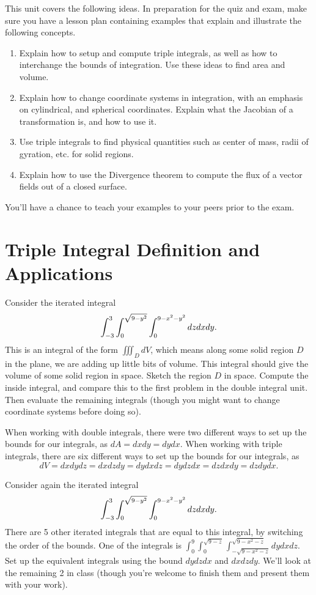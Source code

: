 
\noindent 
This unit covers the following ideas. In preparation for the quiz and exam, make sure you have a lesson plan containing examples that explain and illustrate the following concepts.  
\begin{enumerate}
\item Explain how to setup and compute triple integrals, as well as how to interchange the bounds of integration. Use these ideas to find area and volume.
\item Explain how to change coordinate systems in integration, with an emphasis on cylindrical, and spherical coordinates. Explain what the Jacobian of a transformation is, and how to use it.
\item Use triple integrals to find physical quantities such as center of mass, radii of gyration, etc. for solid regions.
\item Explain how to use the Divergence theorem to compute the flux of a vector fields out of a closed surface.
\end{enumerate}
You'll have a chance to teach your examples to your peers prior to the exam.


\section{Triple Integral Definition and Applications}

\begin{problem}
Consider the iterated integral $$\displaystyle \int_{-3}^3 \int_0^{\sqrt{9-y^2}}\int_0^{9-x^2-y^2} dzdxdy.$$ This is an integral of the form $\iiint_D dV$, which means along some solid region $D$ in the plane, we are adding up little bits of volume. This integral should give the volume of some solid region in space.  Sketch the region $D$ in space.  Compute the inside integral, and compare this to the first problem in the double integral unit.  Then evaluate the remaining integrals (though you might want to change coordinate systems before doing so).
\end{problem}

When working with double integrals, there were two different ways to set up the bounds for our integrals, as $dA=dxdy=dydx$.  When working with triple integrals, there are six different ways to set up the bounds for our integrals, as $$dV=dxdydz = dxdzdy = dydxdz=dydzdx=dzdxdy=dzdydx.$$ 

\begin{problem}
Consider again the iterated integral $$\displaystyle \int_{-3}^3 \int_0^{\sqrt{9-y^2}}\int_0^{9-x^2-y^2} dzdxdy.$$ There are 5 other iterated integrals that are equal to this integral, by switching the order of the bounds. One of the integrals is $\int_0^9\int_0^{\sqrt{9-z}}\int_{-\sqrt{9-x^2-z}}^{\sqrt{9-x^2-z}} dydxdz$. Set up the equivalent integrals using the bound $dydzdx$ and $dxdzdy$.  We'll look at the remaining 2 in class (though you're welcome to finish them and present them with your work). 
\end{problem}

